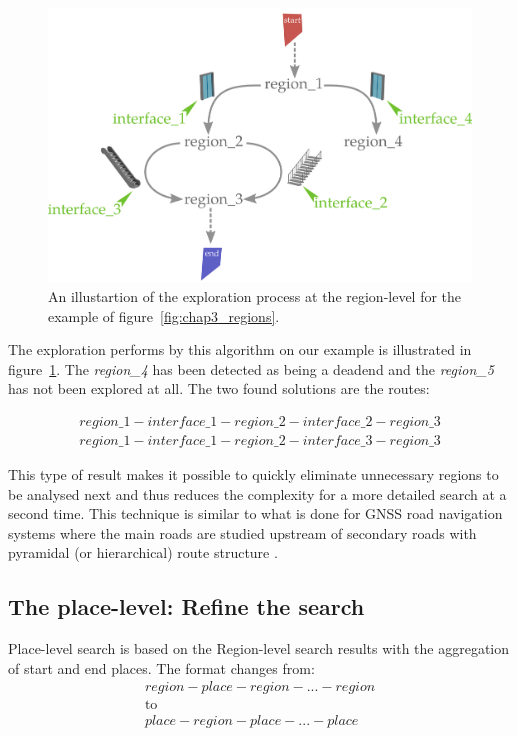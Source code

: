 \begin{figure}[ht!]
\centering
\includegraphics[scale=0.12]{figures/chapter3/Region_exploration_graph.png}
\caption{\label{fig:chap3_region_expl} An illustartion of the exploration process at the region-level for the example of figure~\ref{fig:chap3_regions}.}
\end{figure}

The exploration performs by this algorithm on our example is illustrated in figure~\ref{fig:chap3_region_expl}. The \textit{region\_4} has been detected as being a deadend and the \textit{region\_5} has not been explored at all. The two found solutions are the routes:

\begin{align*}
region\_1 - interface\_1 - region\_2 - interface\_2 - region\_3 \\
region\_1 - interface\_1 - region\_2 - interface\_3 - region\_3
\end{align*}

This type of result makes it possible to quickly eliminate unnecessary regions to be analysed next and thus reduces the complexity for a more detailed search at a second time. This technique is similar to what is done for GNSS road navigation systems where the main roads are studied upstream of secondary roads with pyramidal (or hierarchical) route structure \cite{bovy_2012_route}.

\subsection{The place-level: Refine the search}

Place-level search is based on the Region-level search results with the aggregation of start and end places. The format changes from:
\begin{gather*}
region - place - region - ... - region \\
\text{to} \\
place - region - place - ... - place
\end{gather*}

